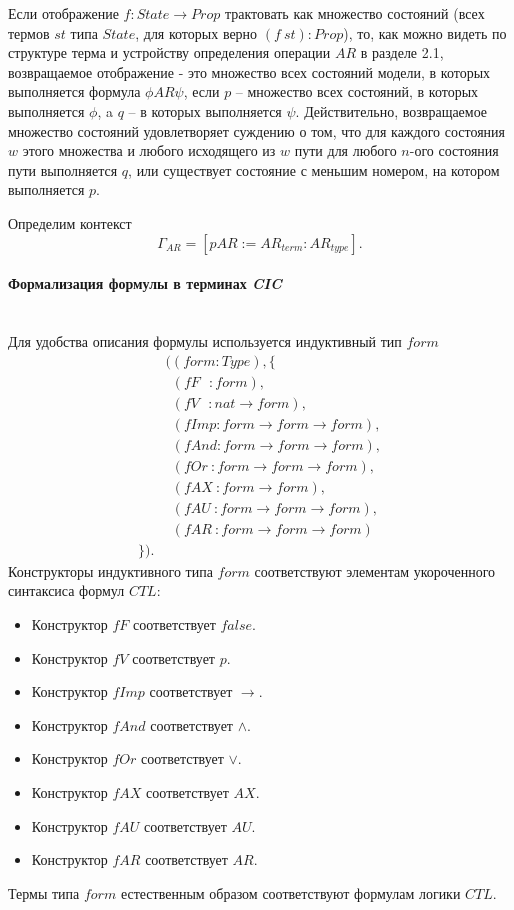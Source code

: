 \documentclass[12pt]{article}
\begin{document}
Если отображение $f : State \xrightarrow{} Prop$ трактовать как множество состояний (всех термов $st$ типа $State$, для которых верно $(f\ st) : Prop$), то, как можно видеть по структуре терма и устройству определения операции $AR$ в разделе 2.1, возвращаемое отображение - это множество всех состояний модели, в которых выполняется формула $\phi AR \psi$, если $p$ -- множество всех состояний, в которых выполняется $\phi$, a $q$ -- в которых выполняется $\psi$.
Действительно, возвращаемое множество состояний удовлетворяет суждению о том, что для каждого состояния $w$ этого множества и любого исходящего из $w$ пути для любого $n$-ого состояния пути выполняется $q$, или существует состояние с меньшим номером, на котором выполняется $p$.

Определим контекст $$\Gamma_{AR} = [pAR:=AR_{term}:AR_{type}].$$

\paragraph{Формализация формулы в терминах \textit{CIC}}\mbox{} \\

Для удобства описания формулы используется индуктивный тип $form$
\begin{align*}
& ((form : Type), \{ \\ 
& \ \ (fF\ \ \ : form), \\
& \ \ (fV\ \ \ : nat \xrightarrow{} form), \\
& \ \ (fImp    : form \xrightarrow{} form \xrightarrow{} form), \\
& \ \ (fAnd    : form \xrightarrow{} form \xrightarrow{} form), \\
& \ \ (fOr\    : form \xrightarrow{} form \xrightarrow{} form), \\
& \ \ (fAX\    : form \xrightarrow{} form), \\
& \ \ (fAU\    : form \xrightarrow{} form \xrightarrow{} form), \\
& \ \ (fAR\    : form \xrightarrow{} form \xrightarrow{} form) \\
\}).
\end{align*}
Конструкторы индуктивного типа $form$ соответствуют элементам укороченного синтаксиса формул $CTL$:
\begin{itemize}
    \item Конструктор $fF$ соответствует $false$.
    \item Конструктор $fV$ соответствует $p$.
    \item Конструктор $fImp$ соответствует $\xrightarrow{}$.
    \item Конструктор $fAnd$ соответствует $\wedge$.
    \item Конструктор $fOr$ соответствует $\vee$.
    \item Конструктор $fAX$ соответствует $AX$.
    \item Конструктор $fAU$ соответствует $AU$.
    \item Конструктор $fAR$ соответствует $AR$.
\end{itemize}
Термы типа $form$ естественным образом соответствуют формулам логики $CTL$.
\end{document}
